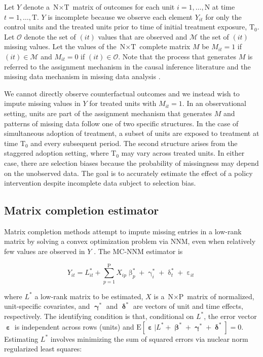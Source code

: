 \documentclass[hidelinks,12pt]{article}
\newcommand{\E}{\mathrm{E}}
\begin{document}
Let $Y$ denote a $\text{N} \times \text{T}$ matrix of outcomes for each unit $i =1, \ldots, \text{N}$ at time $t = 1, \ldots, \text{T}$. $Y$ is incomplete because we observe each element $Y_{it}$ for only the control units and the treated units prior to time of initial treatment exposure, $\text{T}_0$. Let $\mathcal{O}$ denote the set of $(it)$ values that are observed and $\mathcal{M}$ the set of $(it)$ missing values. Let the values of the $\text{N} \times \text{T}$ complete matrix $M$ be $M_{it} =1 $ if $(it) \in \mathcal{M}$ and $M_{it} = 0$ if $(it) \in \mathcal{O}$. Note that the process that generates $M$ is referred to the assignment mechanism in the causal inference literature \citep{imbens2015causal} and the missing data mechanism in missing data analysis \citep{little2014}.

We cannot directly observe counterfactual outcomes and we instead wish to impute missing values in $Y$ for treated units with $M_{it}=1$. In an observational setting, units are part of the assignment mechanism that generates $M$ and patterns of missing data follow one of two specific structures. In the case of simultaneous adoption of treatment, a subset of units are exposed to treatment at time $\text{T}_0$ and every subsequent period. The second structure arises from the staggered adoption setting, where $\text{T}_0$ may vary across treated units. In either case, there are selection biases because the probability of missingness may depend on the unobserved data. The goal is to accurately estimate the effect of a policy intervention despite incomplete data subject to selection bias. 

\subsection{Matrix completion estimator}

Matrix completion methods attempt to impute missing entries in a low-rank matrix by solving a convex optimization problem via NNM, even when relatively few values are observed in $Y$ \citep{candes2009exact,candes2010matrix}. The MC-NNM estimator is 

\begin{equation}
Y_{it} = L_{it}^{*} + \sum_{p=1}^{\text{P}} X_{ip} \upbeta_{p}^{*} + \upgamma_{i}^{*} + \updelta_{t}^{*} + \upepsilon_{it} \label{eq:mc-Y}
\end{equation}

\noindent
where $L^{*}$ a low-rank matrix to be estimated, $X$ is a $\text{N} \times \text{P}$ matrix of normalized, unit-specific covariates, and $\boldsymbol{\upgamma}^{*}$ and $\boldsymbol{\updelta}^{*}$ are vectors of unit and time effects, respectively. The identifying condition is that, conditional on $L^{*}$, the error vector $\boldsymbol{\upepsilon}$ is independent across rows (units) and $\E[\boldsymbol{\upepsilon} | L^{*} + \boldsymbol{\upbeta}^{*} + \boldsymbol{\upgamma}^{*} + \boldsymbol{\updelta}^{*}] = 0$. Estimating $L^{*}$ involves minimizing the sum of squared errors via nuclear norm regularized least squares:
\end{document}
